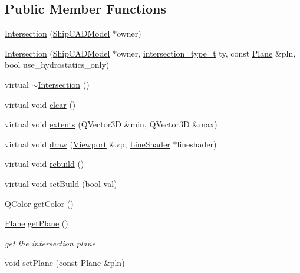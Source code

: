 \subsection*{Public Member Functions}
\begin{DoxyCompactItemize}
\item 
\hyperlink{classShipCAD_1_1Intersection_acde7d35483e1e4ee56ecf75eb7a70f66}{Intersection} (\hyperlink{classShipCAD_1_1ShipCADModel}{Ship\-C\-A\-D\-Model} $\ast$owner)
\item 
\hyperlink{classShipCAD_1_1Intersection_a3a4f17fe81289d26d2ec329dd9db5c69}{Intersection} (\hyperlink{classShipCAD_1_1ShipCADModel}{Ship\-C\-A\-D\-Model} $\ast$owner, \hyperlink{namespaceShipCAD_aa56834b730aafdf2786ddc9a60a046fd}{intersection\-\_\-type\-\_\-t} ty, const \hyperlink{classShipCAD_1_1Plane}{Plane} \&pln, bool use\-\_\-hydrostatics\-\_\-only)
\item 
virtual \hyperlink{classShipCAD_1_1Intersection_a017d0a1000ca2e9eca3537def58b3988}{$\sim$\-Intersection} ()
\item 
virtual void \hyperlink{classShipCAD_1_1Intersection_a2163245dc7153d1590811ab2902d6ee4}{clear} ()
\item 
virtual void \hyperlink{classShipCAD_1_1Intersection_af751d515708531ca098321840a92c47b}{extents} (Q\-Vector3\-D \&min, Q\-Vector3\-D \&max)
\item 
virtual void \hyperlink{classShipCAD_1_1Intersection_a9e346019a52aa0540628b75994ea94a5}{draw} (\hyperlink{classShipCAD_1_1Viewport}{Viewport} \&vp, \hyperlink{classShipCAD_1_1LineShader}{Line\-Shader} $\ast$lineshader)
\item 
virtual void \hyperlink{classShipCAD_1_1Intersection_aed30bdca43037f72b85c4d53e234fd6c}{rebuild} ()
\item 
virtual void \hyperlink{classShipCAD_1_1Intersection_a2b496f9ab21c5fc4a7b97a665b24f2b1}{set\-Build} (bool val)
\item 
Q\-Color \hyperlink{classShipCAD_1_1Intersection_acae07360e9ccef12a498332ac6dbedd9}{get\-Color} ()
\item 
\hyperlink{classShipCAD_1_1Plane}{Plane} \hyperlink{classShipCAD_1_1Intersection_ac0b838a811f8df5c2fa0b0ea44ba4bb7}{get\-Plane} ()
\begin{DoxyCompactList}\small\item\em get the intersection plane \end{DoxyCompactList}\item 
void \hyperlink{classShipCAD_1_1Intersection_a72f2a58ec72cd3a38cf0d59a84650fb5}{set\-Plane} (const \hyperlink{classShipCAD_1_1Plane}{Plane} \&pln)

\end{DoxyCompactItemize}
